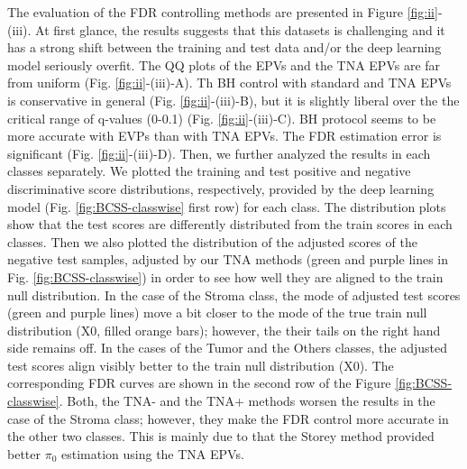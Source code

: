 \documentclass{article}
\begin{document}
The evaluation of the FDR controlling methods are presented in Figure \ref{fig:ii}-(iii). At first glance, the results suggests that this datasets is challenging and it  has a strong shift between the training and test data and/or the deep learning model seriously overfit. The QQ plots of the EPVs and the TNA EPVs are far from uniform (Fig. \ref{fig:ii}-(iii)-A). Th BH control with standard and TNA EPVs is conservative in general (Fig. \ref{fig:ii}-(iii)-B), but it is slightly liberal over the the critical range of q-values (0-0.1) (Fig. \ref{fig:ii}-(iii)-C). BH protocol seems to be more accurate with EVPs than with TNA EPVs. The FDR estimation error is significant (Fig. \ref{fig:ii}-(iii)-D). Then, we further analyzed the results in each classes separately. We plotted the training and test positive and negative discriminative score distributions, respectively, provided by the deep learning model (Fig. \ref{fig:BCSS-classwise} first row) for each class. The distribution plots show that the test scores are differently distributed from the train scores in each classes. Then we also plotted the distribution of the adjusted scores of the negative test samples, adjusted by our TNA methods (green and purple lines in Fig. \ref{fig:BCSS-classwise}) in order to see how well they are aligned to the train null distribution.  In the case of the Stroma class, the mode of adjusted test scores (green and purple lines) move a bit closer to the mode of the true train null distribution (X0, filled orange bars); however, the their tails on the right hand side remains off. In the cases of the Tumor and the Others classes, the adjusted test scores align visibly better to the train null distribution (X0). The corresponding FDR curves are shown in the second row of the Figure \ref{fig:BCSS-classwise}. Both, the TNA- and the TNA+ methods worsen the results in the case of the Stroma class; however, they make the FDR control more accurate in the other two classes. This is mainly due to that the Storey method provided better $\pi_0$ estimation using the TNA EPVs. 
\end{document}
